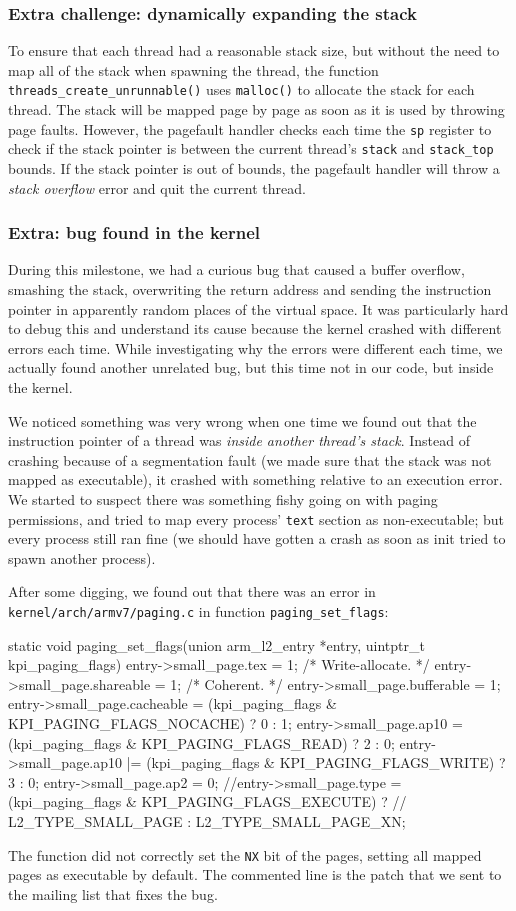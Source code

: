 \documentclass[a4paper,twoside,openright]{report}
\renewcommand{\t}[1]{%
	{\texttt{#1}}}
\begin{document}
\subsubsection{Extra challenge: dynamically expanding the stack}
To ensure that each thread had a reasonable stack size, but without the need to
map all of the stack when spawning the thread, the function
\t{threads\_create\_unrunnable()} uses \t{malloc()} to allocate the stack for
each thread. The stack will be mapped page by page as soon as it is used by
throwing page faults. However, the pagefault handler checks each time the
\t{sp} register to check if the stack pointer is between the current thread's
\t{stack} and \t{stack\_top} bounds. If the stack pointer is out of bounds, the
pagefault handler will throw a \emph{stack overflow} error and quit the current
thread.

\subsubsection{Extra: bug found in the kernel}
During this milestone, we had a curious bug that caused a buffer overflow,
smashing the stack, overwriting the return address and sending the instruction
pointer in apparently random places of the virtual space. It was particularly
hard to debug this and understand its cause because the kernel crashed with
different errors each time.  While investigating why the errors were different
each time, we actually found another unrelated bug, but this time not in our
code, but inside the kernel.

We noticed something was very wrong when one time we found out that the
instruction pointer of a thread was \emph{inside another thread's stack}.
Instead of crashing because of a segmentation fault (we made sure that the
stack was not mapped as executable), it crashed with something relative to an
execution error. We started to suspect there was something fishy going on with
paging permissions, and tried to map every process' \t{text} section as
non-executable; but every process still ran fine (we should have gotten a crash
as soon as init tried to spawn another process).

After some digging, we found out that there was an error in \t{kernel/arch/armv7/paging.c}
in function \t{paging\_set\_flags}:
\begin{pandacode}
static void
paging_set_flags(union arm_l2_entry *entry, uintptr_t kpi_paging_flags)
{
		entry->small_page.tex = 1; /* Write-allocate. */
		entry->small_page.shareable = 1; /* Coherent. */
		entry->small_page.bufferable = 1;
		entry->small_page.cacheable =
			(kpi_paging_flags & KPI_PAGING_FLAGS_NOCACHE) ? 0 : 1;
		entry->small_page.ap10  =
			(kpi_paging_flags & KPI_PAGING_FLAGS_READ)  ? 2 : 0;
		entry->small_page.ap10 |=
			(kpi_paging_flags & KPI_PAGING_FLAGS_WRITE) ? 3 : 0;
		entry->small_page.ap2 = 0;
		//entry->small_page.type = (kpi_paging_flags & KPI_PAGING_FLAGS_EXECUTE) ?
		//	L2_TYPE_SMALL_PAGE : L2_TYPE_SMALL_PAGE_XN; 
}
\end{pandacode}
The function did not correctly set the \t{NX} bit of the pages, setting all mapped 
pages as executable by default. The commented line is the patch that we sent to the
mailing list that fixes the bug.
\end{document}
